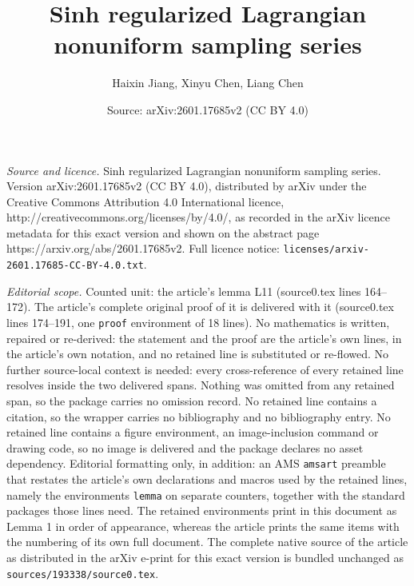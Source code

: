 \documentclass[10pt,a4paper]{amsart}
\title{Sinh regularized Lagrangian nonuniform sampling series}
\author{Haixin Jiang, Xinyu Chen, Liang Chen}
\date{Source: arXiv:2601.17685v2 (CC BY 4.0)}
\begin{document}
\maketitle

\noindent\emph{Source and licence.} Sinh regularized Lagrangian nonuniform sampling series. Version arXiv:2601.17685v2 (CC BY 4.0), distributed by arXiv under the Creative Commons Attribution 4.0 International licence, http://creativecommons.org/licenses/by/4.0/, as recorded in the arXiv licence metadata for this exact version and shown on the abstract page https://arxiv.org/abs/2601.17685v2. Full licence notice: \texttt{licenses/arxiv-2601.17685-CC-BY-4.0.txt}.\par\smallskip

\noindent\textit{Editorial scope.} Counted unit: the article's lemma L11 (source0.tex lines 164--172). The article's complete original proof of it is delivered with it (source0.tex lines 174--191, one \texttt{proof} environment of 18 lines). No mathematics is written, repaired or re-derived: the statement and the proof are the article's own lines, in the article's own notation, and no retained line is substituted or re-flowed.  No further source-local context is needed: every cross-reference of every retained line resolves inside the two delivered spans.  Nothing was omitted from any retained span, so the package carries no omission record.  No retained line contains a citation, so the wrapper carries no bibliography and no bibliography entry.  No retained line contains a figure environment, an image-inclusion command or drawing code, so no image is delivered and the package declares no asset dependency.  Editorial formatting only, in addition: an AMS \texttt{amsart} preamble that restates the article's own declarations and macros used by the retained lines, namely the environments \texttt{lemma} on separate counters, together with the standard packages those lines need.  The retained environments print in this document as Lemma 1 in order of appearance, whereas the article prints the same items with the numbering of its own full document.  The complete native source of the article as distributed in the arXiv e-print for this exact version is bundled unchanged as \texttt{sources/193338/source0.tex}.
\end{document}
